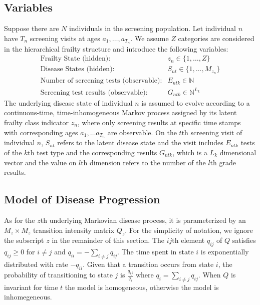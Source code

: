 \documentclass{article}
\begin{document}
\subsection{Variables}
Suppose there are $N$ individuals in the screening population.  Let individual $n$ have $T_n$ screening visits at ages $a_1, \ldots, a_{T_n}$. We assume $Z$ categories are considered in the hierarchical frailty structure and introduce the following variables:
\begin{eqnarray}
\textrm{Frailty State (hidden):} & z_{n} \in \{1, \ldots, Z\} \nonumber \\
\textrm{Disease States (hidden):} & S_{nt} \in \{1, \ldots, M_{z_n}\} \nonumber \\
\textrm{Number of screening tests (observable):} & E_{ntk} \in \mathbb{N} \nonumber \\
\textrm{Screening test results (observable):} & G_{ntk} \in \mathbb{N}^{L_k} \nonumber 
\end{eqnarray}
The underlying disease state of individual $n$ is assumed to evolve according to a continuous-time, time-inhomogeneous Markov process assigned by its latent frailty class indicator $z_n$, where only screening results at specific time stamps with corresponding ages $a_1, \ldots a_{T_n}$ are observable. On the $t$th screening visit of individual $n$, $S_{nt}$ refers to the latent disease state and the visit includes $E_{ntk}$ tests of the $k$th test type and the corresponding results $G_{ntk}$, which is a $L_k$ dimensional vector and the value on $l$th dimension refers to the number of the $l$th grade results. 

\subsection{Model of Disease Progression}
As for the $z$th underlying Markovian disease process, it is parameterized by an $M_z \times M_z$ transition intensity matrix $Q_z$. For the simplicity of notation, we ignore the subscript $z$ in the remainder of this section. The $ij$th element $q_{ij}$ of $Q$ satisfies $q_{ij} \geq 0$ for $i\neq j$ and $q_{ii} = -\sum_{i\neq j}q_{ij}$.    
The time spent in state $i$ is exponentially distributed with rate $-q_{ii}$.  Given that a transition occurs from state $i$,  the probability of transitioning to state $j$ is $\frac{q_{ij}}{q_i}$ where $q_i = \sum_{i\neq j}q_{ij}$.
When $Q$ is invariant for time $t$ the model is homogeneous, otherwise the model is inhomegeneous. 
\end{document}
